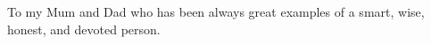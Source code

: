 \vspace*{7cm}
\begin{center}
To my Mum and Dad who has been always great examples of a smart, wise, honest, and devoted person.  
\end{center}
